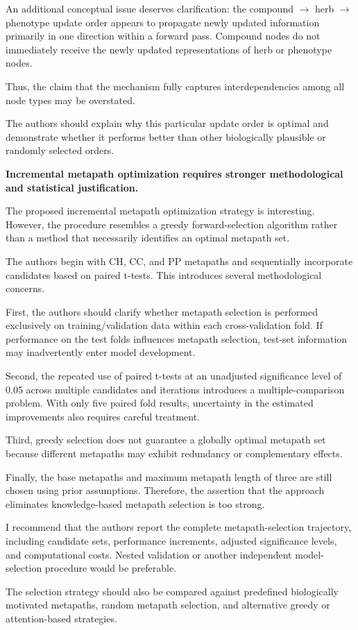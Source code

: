 \documentclass[11pt,american]{article}
\begin{document}
\begin{revcomment}
An additional conceptual issue deserves clarification: the compound $\rightarrow$ herb $\rightarrow$ phenotype update order appears to propagate newly updated information primarily in one direction within a forward pass. Compound nodes do not immediately receive the newly updated representations of herb or phenotype nodes.

Thus, the claim that the mechanism fully captures interdependencies among all node types may be overstated.

The authors should explain why this particular update order is optimal and demonstrate whether it performs better than other biologically plausible or randomly selected orders.
\end{revcomment}

\begin{revresponse}

\end{revresponse}

\begin{revcomment}
\textbf{Incremental metapath optimization requires stronger methodological and statistical justification.}

The proposed incremental metapath optimization strategy is interesting. However, the procedure resembles a greedy forward-selection algorithm rather than a method that necessarily identifies an optimal metapath set.

The authors begin with CH, CC, and PP metapaths and sequentially incorporate candidates based on paired t-tests. This introduces several methodological concerns.

First, the authors should clarify whether metapath selection is performed exclusively on training/validation data within each cross-validation fold. If performance on the test folds influences metapath selection, test-set information may inadvertently enter model development.

Second, the repeated use of paired t-tests at an unadjusted significance level of 0.05 across multiple candidates and iterations introduces a multiple-comparison problem. With only five paired fold results, uncertainty in the estimated improvements also requires careful treatment.

Third, greedy selection does not guarantee a globally optimal metapath set because different metapaths may exhibit redundancy or complementary effects.

Finally, the base metapaths and maximum metapath length of three are still chosen using prior assumptions. Therefore, the assertion that the approach eliminates knowledge-based metapath selection is too strong.

I recommend that the authors report the complete metapath-selection trajectory, including candidate sets, performance increments, adjusted significance levels, and computational costs. Nested validation or another independent model-selection procedure would be preferable.

The selection strategy should also be compared against predefined biologically motivated metapaths, random metapath selection, and alternative greedy or attention-based strategies.
\end{revcomment}
\end{document}
